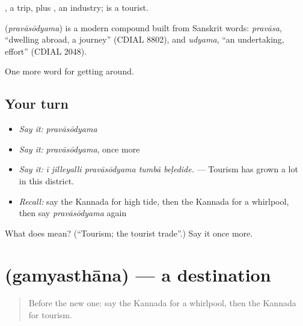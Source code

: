 , a trip, plus , an industry;  is a tourist.

\begin{cousinweb}
\textbf{} (\emph{pravāsōdyama}) is a modern compound built from Sanskrit words: \emph{pravāsa}, \textquotedblleft{}dwelling abroad, a journey\textquotedblright{} (CDIAL 8802), and \emph{udyama}, \textquotedblleft{}an undertaking, effort\textquotedblright{} (CDIAL 2048).
\end{cousinweb}

\begin{grammarlens}[title={What you've built}]
One more word for getting around.
\end{grammarlens}

\subsection*{Your turn}
\begin{itemize}
\raggedright
  \item \emph{Say it:} \emph{pravāsōdyama}
  \item \emph{Say it:} \emph{pravāsōdyama}, once more
  \item \emph{Say it:} \emph{ī jilleyalli pravāsōdyama tumbā beḷedide.} — Tourism has grown a lot in this district.
  \item \emph{Recall:} say the Kannada for high tide, then the Kannada for a whirlpool, then say \emph{pravāsōdyama} again
\end{itemize}

\begin{tcolorbox}[breakable,colback=teal!4,colframe=teal!35!black,title={Before you move on}]
What does  mean? (\textquotedblleft{}Tourism; the tourist trade\textquotedblright{}.) Say it once more.
\end{tcolorbox}
\section[\texorpdfstring{\kn{ಗಮ್ಯಸ್ಥಾನ} (gamyasthāna)}{ಗಮ್ಯಸ್ಥಾನ (gamyasthāna)}]{ (gamyasthāna) — a destination}

\label{lesson:KA-C455-gamyasthana}



\begin{quote}
Before the new one: say the Kannada for a whirlpool, then the Kannada for tourism.
\end{quote}

